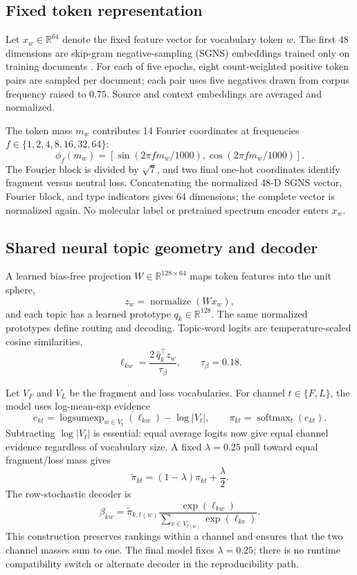 \documentclass[10pt,a4paper]{article}
\newcommand{\softmax}{\operatorname{softmax}}
\newcommand{\normalize}{\operatorname{normalize}}
\newcommand{\logsumexp}{\operatorname{logsumexp}}
\begin{document}
\subsection{Fixed token representation}

Let $x_w\in\mathbb{R}^{64}$ denote the fixed feature vector for vocabulary token
$w$. The first 48 dimensions are skip-gram negative-sampling (SGNS) embeddings
trained only on training documents \cite{mikolov2013}. For each of five epochs,
eight count-weighted positive token pairs are sampled per document; each pair
uses five negatives drawn from corpus frequency raised to $0.75$. Source and
context embeddings are averaged and normalized.

The token mass $m_w$ contributes 14 Fourier coordinates at frequencies
$f\in\{1,2,4,8,16,32,64\}$:
\[
  \phi_f(m_w)=\left[
    \sin\!\left(2\pi f m_w/1000\right),
    \cos\!\left(2\pi f m_w/1000\right)
  \right].
\]
The Fourier block is divided by $\sqrt{7}$, and two final one-hot coordinates
identify fragment versus neutral loss. Concatenating the normalized 48-D SGNS
vector, Fourier block, and type indicators gives 64 dimensions; the complete
vector is normalized again. No molecular label or pretrained spectrum encoder
enters $x_w$.

\subsection{Shared neural topic geometry and decoder}

A learned bias-free projection $W\in\mathbb{R}^{128\times64}$ maps token
features into the unit sphere,
\[
  z_w=\normalize(Wx_w),
\]
and each topic has a learned prototype $q_k\in\mathbb{R}^{128}$. The same
normalized prototypes define routing and decoding. Topic-word logits are
temperature-scaled cosine similarities,
\[
  \ell_{kw}=\frac{2\,\widehat q_k^\top z_w}{\tau_\beta},
  \qquad \tau_\beta=0.18.
\]

Let $V_F$ and $V_L$ be the fragment and loss vocabularies. For channel
$t\in\{F,L\}$, the model uses log-mean-exp evidence
\[
  e_{kt}=\logsumexp_{w\in V_t}(\ell_{kw})-\log|V_t|,
  \qquad \pi_{kt}=\softmax_t(e_{kt}).
\]
Subtracting $\log|V_t|$ is essential: equal average logits now give equal
channel evidence regardless of vocabulary size. A fixed $\lambda=0.25$ pull
toward equal fragment/loss mass gives
\[
  \widetilde\pi_{kt}=(1-\lambda)\pi_{kt}+\frac{\lambda}{2}.
\]
The row-stochastic decoder is
\[
  \beta_{kw}=\widetilde\pi_{k,t(w)}
  \frac{\exp(\ell_{kw})}{\sum_{v\in V_{t(w)}}\exp(\ell_{kv})}.
\]
This construction preserves rankings within a channel and ensures that the two
channel masses sum to one. The final model fixes $\lambda=0.25$; there is no
runtime compatibility switch or alternate decoder in the reproducibility path.
\end{document}
